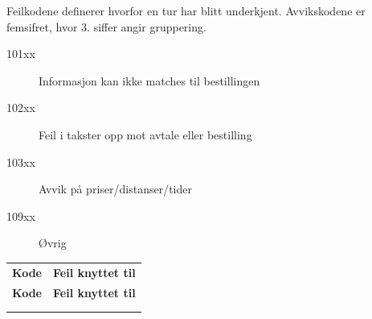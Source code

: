 \documentclass[a4paper,titlepage,norsk,11pt]{article}
\begin{document}
Feilkodene definerer hvorfor en tur har blitt underkjent. Avvikskodene er femsifret, hvor 3. siffer angir gruppering.

\begin{description}
  \item[101xx] Informasjon kan ikke matches til bestillingen
  \item[102xx] Feil i takster opp mot avtale eller bestilling
  \item[103xx] Avvik på priser/distanser/tider
  \item[109xx] Øvrig
\end{description}


\begin{longtabu}to 
\tabucline{-}
\textbf{Kode} & \textbf{Feil knyttet til} \\
\tabucline{-}
\endfirsthead
\tabucline{-}
\textbf{Kode} & \textbf{Feil knyttet til} \\
\tabucline{-}
\endhead
{} \\
\endfoot
\endlastfoot


\end{longtabu}
\end{document}
